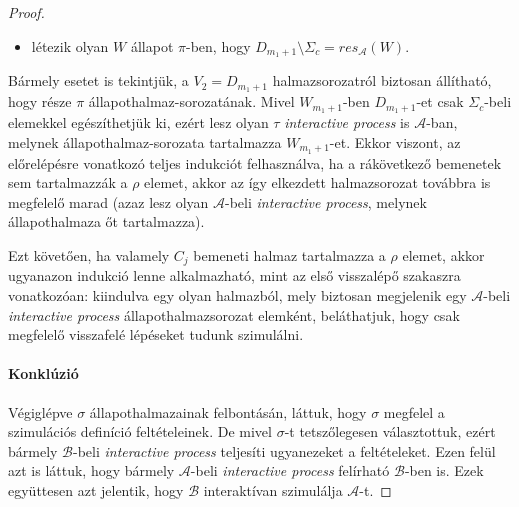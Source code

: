 \documentclass[12pt]{article}
\theoremstyle{definition}
\theoremstyle{remark}
\theoremstyle{plain}
\theoremstyle{plain}
\let\emptyset\varnothing
\newcommand{\backwardhat}{\overset{\leftharpoonup}}
\newcommand{\res}{\textit{res}}
\begin{document}
\begin{proof}
\begin{itemize}
            \item
            létezik olyan $W$ állapot $\pi$-ben, hogy $D_{m_{1} + 1} \setminus \Sigma_{c} = \res_{\mathscr{A}}(W)$.
        \end{itemize}
        Bármely esetet is tekintjük, a $V_{2} = D_{m_{1} + 1}$ halmazsorozatról biztosan állítható, hogy része $\pi$ állapothalmaz-sorozatának. Mivel $W_{m_{1} + 1}$-ben $D_{m_{1} + 1}$-et csak $\Sigma_{c}$-beli elemekkel egészíthetjük ki, ezért lesz olyan $\tau$ \textit{interactive process} is $\mathscr{A}$-ban, melynek állapothalmaz-sorozata tartalmazza $W_{m_{1} + 1}$-et. Ekkor viszont, az előrelépésre vonatkozó teljes indukciót felhasználva, ha a rákövetkező bemenetek sem tartalmazzák a $\rho$ elemet, akkor az így elkezdett halmazsorozat továbbra is megfelelő marad (azaz lesz olyan $\mathscr{A}$-beli \textit{interactive process}, melynek állapothalmaza őt tartalmazza).
        
        Ezt követően, ha valamely $C_{j}$ bemeneti halmaz tartalmazza a $\rho$ elemet, akkor ugyanazon indukció lenne alkalmazható, mint az első visszalépő szakaszra vonatkozóan: kiindulva egy olyan halmazból, mely biztosan megjelenik egy $\mathscr{A}$-beli \textit{interactive process} állapothalmazsorozat elemként, beláthatjuk, hogy csak megfelelő visszafelé lépéseket tudunk szimulálni.
        
        \paragraph{Konklúzió}
        Végiglépve $\sigma$ állapothalmazainak felbontásán, láttuk, hogy $\sigma$ megfelel a szimulációs definíció feltételeinek. De mivel $\sigma$-t tetszőlegesen választottuk, ezért bármely $\mathscr{B}$-beli \textit{interactive process} teljesíti ugyanezeket a feltételeket. Ezen felül azt is láttuk, hogy bármely $\mathscr{A}$-beli \textit{interactive process} felírható $\mathscr{B}$-ben is. Ezek együttesen azt jelentik, hogy $\mathscr{B}$ interaktívan szimulálja $\mathscr{A}$-t.
    \end{proof}
\end{document}
